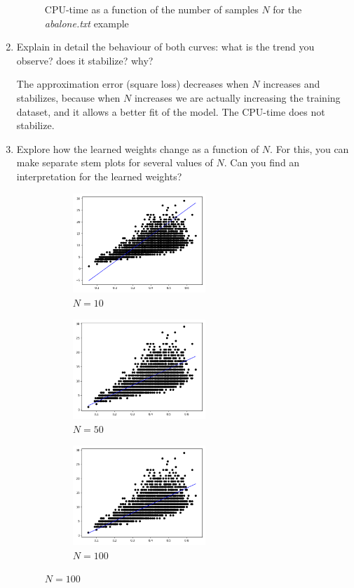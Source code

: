 \documentclass[12pt,letterpaper]{article}
\begin{document}
\begin{enumerate}[leftmargin=!,labelindent=5pt]
\begin{figure}[H]
            \caption{CPU-time as a function of the number of samples $N$ for the \textit{abalone.txt} example}
            \label{fig:1}
        \end{figure}
        
    \newpage
    \item Explain in detail the behaviour of both curves: what is the trend you observe? does it stabilize? why?
    
    The approximation error (square loss) decreases when $N$ increases and stabilizes, because when $N$ increases we are actually increasing the training dataset, and it allows a better fit of the model.
    The CPU-time does not stabilize.
        
        
    \newpage
    \item Explore how the learned weights change as a function of $N$. For this, you can make separate stem plots for several values of $N$. Can you find an interpretation for the learned weights?

        \begin{figure}[H]
        \begin{subfigure}{0.3\textwidth}
        \includegraphics[width=5cm]{images/M10.jpg} 
        \caption{$N = 10$}
        \label{fig:subim4}
        \end{subfigure}
        \begin{subfigure}{0.3\textwidth}
        \includegraphics[width=5cm]{images/M50.jpg}
        \caption{$N = 50$}
        \label{fig:subim5}
        \end{subfigure}
        \begin{subfigure}{0.3\textwidth}
        \includegraphics[width=5cm]{images/M100.jpg}
        \caption{$N = 100$}
        \label{fig:subim6}
        \end{subfigure}
        

\end{figure}
\end{enumerate}
\end{document}
